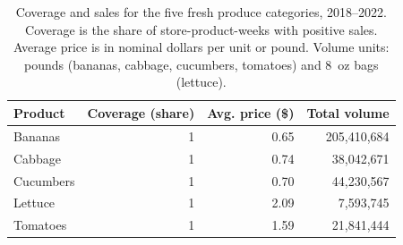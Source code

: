 \begin{table}[!h]
\centering
\caption{\label{tab:product_coverage}Coverage and sales for the five fresh produce categories, 2018--2022. Coverage is the share of store-product-weeks with positive sales. Average price is in nominal dollars per unit or pound. Volume units: pounds (bananas, cabbage, cucumbers, tomatoes) and 8~oz bags (lettuce).}
\centering
\begin{tabular}[t]{lrrr}
\toprule
Product & Coverage (share) & Avg. price (\$) & Total volume\\
\midrule
Bananas & 1 & 0.65 & 205,410,684\\
Cabbage & 1 & 0.74 & 38,042,671\\
Cucumbers & 1 & 0.70 & 44,230,567\\
Lettuce & 1 & 2.09 & 7,593,745\\
Tomatoes & 1 & 1.59 & 21,841,444\\
\bottomrule
\end{tabular}
\end{table}
